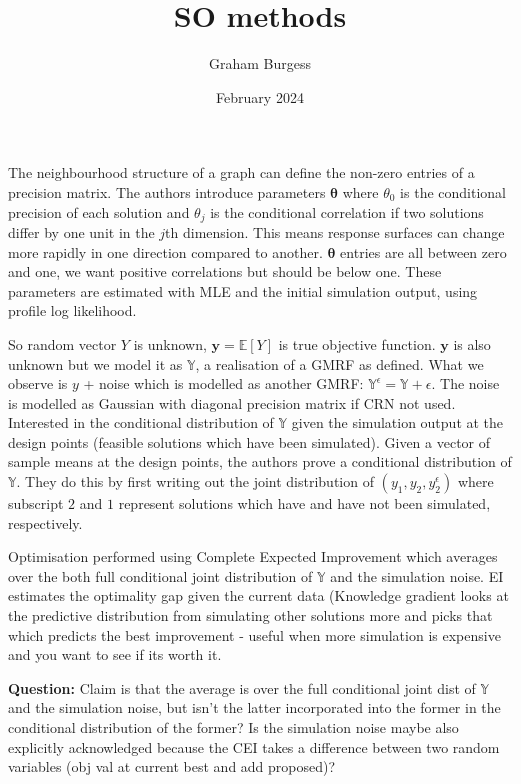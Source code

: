 \message{ !name(SO-Methods.tex)}\documentclass{article}
\title{SO methods}
\author{Graham Burgess}
\date{February 2024}
\begin{document}
The neighbourhood structure of a graph can define the non-zero entries of a precision matrix. The authors introduce parameters $\boldsymbol{\theta}$ where $\theta_0$ is the conditional precision of each solution and $\theta_j$ is the conditional correlation if two solutions differ by one unit in the $j$th dimension. This means response surfaces can change more rapidly in one direction compared to another. $\boldsymbol{\theta}$ entries are all between zero and one, we want positive correlations but should be below one. These parameters are estimated with MLE and the initial simulation output, using profile log likelihood. \newline

So random vector $Y$ is unknown, $\boldsymbol{y}=\mathbb{E}[Y]$ is true objective function. $\boldsymbol{y}$ is also unknown but we model it as $\mathbb{Y}$, a realisation of a GMRF as defined. What we observe is $y$ + noise which is modelled as another GMRF: $\mathbb{Y}^{\epsilon} = \mathbb{Y} + \epsilon$. The noise is modelled as Gaussian with diagonal precision matrix if CRN not used. Interested in the conditional distribution of $\mathbb{Y}$ given the simulation output at the design points (feasible solutions which have been simulated). Given a vector of sample means at the design points, the authors prove a conditional distribution of $\mathbb{Y}$. They do this by first writing out the joint distribution of $(y_1,y_2,y_2^{\epsilon})$ where subscript $2$ and $1$ represent solutions which have and have not been simulated, respectively.\newline

Optimisation performed using Complete Expected Improvement which averages over the both full conditional joint distribution of $\mathbb{Y}$ and the simulation noise. EI estimates the optimality gap given the current data (Knowledge gradient looks at the predictive distribution from simulating other solutions more and picks that which predicts the best improvement - useful when more simulation is expensive and you want to see if its worth it. \newline

\textbf{Question: } Claim is that the average is over the full conditional joint dist of $\mathbb{Y}$ and the simulation noise, but isn't the latter incorporated into the former in the conditional distribution of the former? Is the simulation noise maybe also explicitly acknowledged because the CEI takes a difference between two random variables (obj val at current best and add proposed)? \newline
\end{document}
